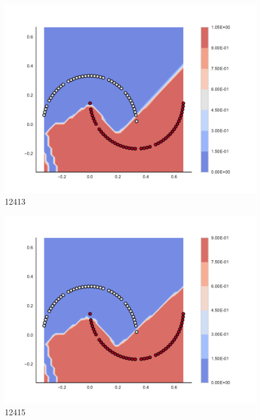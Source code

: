 \begin{subfigure}[b]{0.09\textwidth}
    \includegraphics[clip, trim=2.35cm 1.75cm 4.5cm 0cm,width=\textwidth]{img/convergence/12413.pdf}
    \caption{12413}
    \label{fig:convergence_12413}
\end{subfigure}
%
\begin{subfigure}[b]{0.09\textwidth}
    \includegraphics[clip, trim=2.35cm 1.75cm 4.5cm 0cm,width=\textwidth]{img/convergence/12415.pdf}
    \caption{12415}
    \label{fig:convergence_12415}
\end{subfigure}
%
